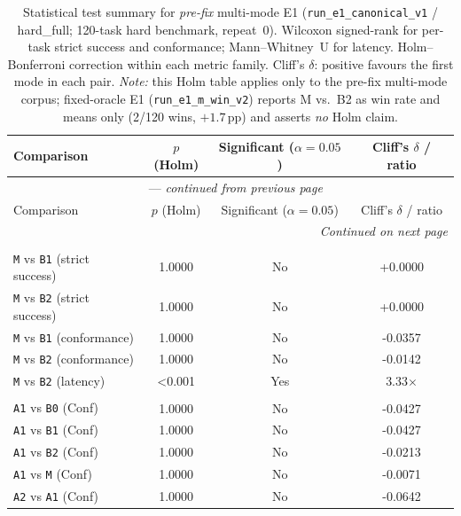 \footnotesize
\begin{longtable}{lccc}
\caption{Statistical test summary for \emph{pre-fix} multi-mode E1
  (\texttt{run\_e1\_canonical\_v1} / hard\_full; 120-task hard benchmark,
  repeat~0).
  Wilcoxon signed-rank for per-task strict success and conformance;
  Mann--Whitney~U for latency.
  Holm--Bonferroni correction within each metric family.
  Cliff's $\delta$: positive favours the first mode in each pair.
  \emph{Note:} this Holm table applies only to the pre-fix multi-mode
  corpus; fixed-oracle E1 (\texttt{run\_e1\_m\_win\_v2}) reports M vs.\ B2
  as win rate and means only (2/120 wins, ${+}1.7$\,pp) and asserts
  \emph{no} Holm claim.}
\label{tab:stats} \\
\toprule
Comparison & $p$ (Holm) & Significant ($\alpha{=}0.05$) & Cliff's $\delta$ / ratio \\
\midrule
\endfirsthead
\multicolumn{4}{c}{\tablename~\thetable{} --- \textit{continued from previous page}} \\
\toprule
Comparison & $p$ (Holm) & Significant ($\alpha{=}0.05$) & Cliff's $\delta$ / ratio \\
\midrule
\endhead
\midrule
\multicolumn{4}{r}{\textit{Continued on next page}} \\
\endfoot
\bottomrule
\endlastfoot
\multicolumn{4}{l}{\textit{Primary comparisons}} \\
\addlinespace
\texttt{M} vs \texttt{B1} (strict success) & 1.0000 & No & +0.0000 \\
\texttt{M} vs \texttt{B2} (strict success) & 1.0000 & No & +0.0000 \\
\texttt{M} vs \texttt{B1} (conformance) & 1.0000 & No & -0.0357 \\
\texttt{M} vs \texttt{B2} (conformance) & 1.0000 & No & -0.0142 \\
\texttt{M} vs \texttt{B2} (latency) & <0.001 & Yes & 3.33$\times$ \\
\addlinespace
\multicolumn{4}{l}{\textit{All pairwise conformance (Holm-corrected)}} \\
\addlinespace
\texttt{A1} vs \texttt{B0} (Conf) & 1.0000 & No & -0.0427 \\
\texttt{A1} vs \texttt{B1} (Conf) & 1.0000 & No & -0.0427 \\
\texttt{A1} vs \texttt{B2} (Conf) & 1.0000 & No & -0.0213 \\
\texttt{A1} vs \texttt{M} (Conf) & 1.0000 & No & -0.0071 \\
\texttt{A2} vs \texttt{A1} (Conf) & 1.0000 & No & -0.0642 \\

\end{longtable}
